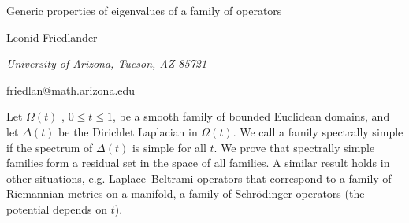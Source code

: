 \documentclass[10pt,a4paper]{article}
\begin{document}
\begin{center}

{\Large Generic properties of eigenvalues of a family of operators}

\bigskip

{\sc Leonid Friedlander}

{\small\it University of Arizona, Tucson, AZ 85721}

{\small\rm friedlan@math.arizona.edu}

\end{center}

\bigskip


Let $\Omega(t)$ , $0\leq t\leq 1$, be a smooth family of bounded Euclidean domains, and let $\Delta(t)$ be the Dirichlet Laplacian in $\Omega(t)$. We call a family spectrally simple
if the spectrum of $\Delta(t)$ is simple for all $t$. We prove that spectrally simple
families form a residual set in the space of all families. A similar result holds in other situations, e.g. Laplace--Beltrami operators that correspond to a family of Riemannian metrics on a manifold, a family of Schr\"odinger operators (the potential depends on $t$). 
\end{document}
